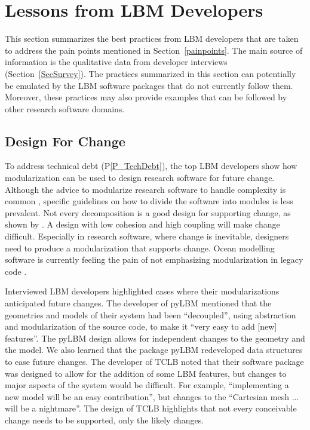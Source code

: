 \documentclass[final, 3p, times, authoryear]{elsarticle}
\newcommand{\ppref}[1]{P\ref{#1}}
\begin{document}
\section{Lessons from LBM Developers} \label{Sec_AddressConcerns}

This section summarizes the best practices from LBM developers that are taken to
address the pain points mentioned in Section~\ref{painpoints}.  The main source
of information is the qualitative data from developer interviews
(Section~\ref{SecSurvey}).  The practices summarized in this section can
potentially be emulated by the LBM software packages that do not currently
follow them.  Moreover, these practices may also provide examples that can be
followed by other research software domains.

\subsection{Design For Change} \label{Sec_DesForChange}

To address technical debt (\ppref{P_TechDebt}), the top LBM developers show how
modularization can be used to design research software for future change.
Although the advice to modularize research software to handle complexity is
common \citep{WilsonEtAl2014, StewartEtAl2017, Storer2017}, specific guidelines
on how to divide the software into modules is less prevalent.  Not every
decomposition is a good design for supporting change, as shown by
\citet{Parnas1972a}.  A design with low cohesion and high coupling \citep[p.\
48]{GhezziEtAl2003} will make change difficult. Especially in research software,
where change is inevitable, designers need to produce a modularization that
supports change. Ocean modelling software is currently feeling the pain of
not emphasizing modularization in legacy code \citep{Reiner2022}.

Interviewed LBM developers highlighted cases where their modularizations
anticipated future changes.  The developer of pyLBM mentioned that the
geometries and models of their system had been ``decoupled'', using abstraction
and modularization of the source code, to make it ``very easy to add [new]
features''.  The pyLBM design allows for independent changes to the geometry and
the model.  We also learned that the package pyLBM redeveloped data structures
to ease future changes. The developer of TCLB noted that their software package
was designed to allow for the addition of some LBM features, but changes to
major aspects of the system would be difficult. For example, ``implementing a
new model will be an easy contribution'', but changes to the ``Cartesian mesh
... will be a nightmare''.  The design of TCLB highlights that not every
conceivable change needs to be supported, only the likely changes.
\end{document}
